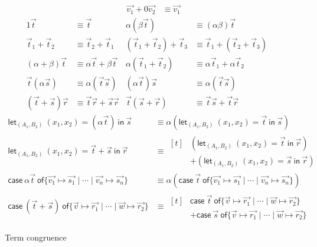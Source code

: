 \documentclass[runningheads,orivec,envcountsame,envcountsect]{llncs}
\def\Pair#1#2{(#1,#2)} %
\def\letkeyword{\mathsf{let}}
\def\inkeyword{\mathsf{in}}
\def\LetP#1#2#3#4#5#6{\letkeyword_{\Pair{#2}{#4}}~\Pair{#1}{#3}=#5~\inkeyword~#6}
\def\gencase#1#2#3#4#5{\ensuremath{\mathsf{case}~#1~\mathsf{of} \{#2\mapsto #4 \mid \dotsb \mid #3\mapsto #5\}}}
\begin{document}
\begin{table*}[t]
  \begin{align*}
    \vec{v_1} + 0\vec{v_2} &\equiv \vec{v_1}
  \end{align*}
  \begin{align*}
    1\vec{t} &\equiv \vec{t} &
    \alpha(\beta\vec{t}) &\equiv (\alpha\beta)\vec{t} \\
    \vec{t}_1+\vec{t}_2 &\equiv \vec{t}_2+\vec{t}_1 &
    (\vec{t}_1+\vec{t}_2)+\vec{t}_3 &\equiv \vec{t}_1+(\vec{t}_2+\vec{t}_3) \\
    (\alpha+\beta)\vec{t} &\equiv \alpha\vec{t}+\beta\vec{t} &
    \alpha(\vec{t}_1+\vec{t}_2) &\equiv \alpha\vec{t}_1+\alpha\vec{t}_2 \\
    \vec{t}(\alpha\vec{s}) &\equiv \alpha(\vec{t}\vec{s}) &
    (\alpha\vec{t})\vec{s} &\equiv \alpha(\vec{t}\vec{s}) \\
    (\vec{t}+\vec{s})\vec{r} &\equiv \vec{t}\vec{r}+\vec{s}\vec{r} &
    \vec{t}(\vec{s}+\vec{r}) &\equiv \vec{t}\vec{s}+\vec{t}\vec{r} &&
  \end{align*}
  \begin{align*}
    \LetP{x_1}{A_1}{x_2}{B_2}{(\alpha\vec{t})}{\vec{s}}
    &\equiv \alpha(\LetP{x_1}{A_1}{x_2}{B_2}{\vec{t}}{\vec{s}}) \\
    \LetP{x_1}{A_1}{x_2}{B_2}{\vec{t}+\vec{s}}{\vec{r}}
    &
    \equiv
    \begin{aligned}[t]
      &(\LetP{x_1}{A_1}{x_2}{B_2}{\vec{t}}{\vec{r}})\\
      &+(\LetP{x_1}{A_1}{x_2}{B_2}{\vec{s}}{\vec{r}}) 
    \end{aligned}\\
    \gencase{\alpha \vec{t}}{\vec{v_1}}{\vec{v_n}}{\vec{s_1}}{\vec{s_n}}
    &\equiv \alpha(\gencase{\vec{t}}{\vec{v_1}}{\vec{v_n}}{\vec{s_1}}{\vec{s_n}}) \\
    \gencase{(\vec{t}+\vec{s})}{\vec{v}}{\vec{w}}{\vec{r_1}}{\vec{r_2}}
    &\equiv\begin{aligned}[t]
      &\gencase{\vec{t}}{\vec{v}}{\vec{w}}{\vec{r_1}}{\vec{r_2}}\\
      &+\gencase{\vec{s}}{\vec{v}}{\vec{w}}{\vec{r_1}}{\vec{r_2}}
    \end{aligned}
  \end{align*}
  \caption{Term congruence}
  \label{tab:Congruence}
\end{table*}
\end{document}
